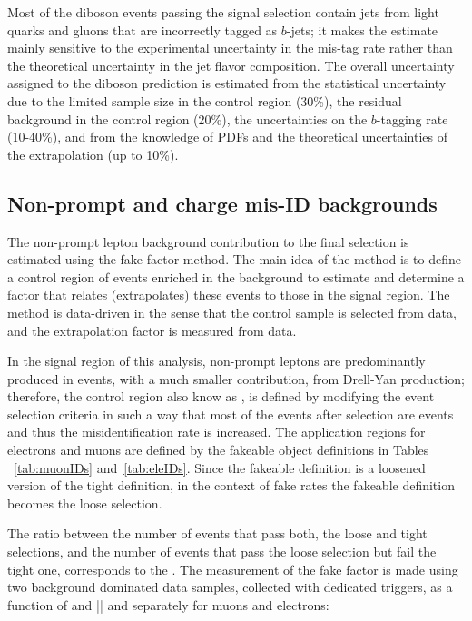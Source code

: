 Most of the diboson events passing the signal selection contain jets from light quarks and gluons that are incorrectly tagged as $b$-jets; it makes the estimate mainly sensitive to the experimental uncertainty in the mis-tag rate rather than the theoretical uncertainty in the jet flavor composition. The overall uncertainty assigned to the diboson prediction is estimated from the statistical uncertainty due to the limited sample size in the control region (30\%), the residual background in the control region (20\%), the uncertainties on the $b$-tagging rate (10-40\%), and from the knowledge of PDFs and the theoretical uncertainties of the extrapolation (up to 10\%).

\subsection{Non-prompt and charge mis-ID backgrounds}\label{ssec:fake_rate}

The non-prompt lepton background contribution to the final selection is estimated using the fake factor method. The main idea of the method is to define a control region of events enriched in the background to estimate and determine a factor that relates (extrapolates) these events to those in the signal region. The method is data-driven in the sense that the control sample is selected from data, and the extrapolation factor is measured from data.

In the signal region of this analysis, non-prompt leptons are predominantly produced in \ttbar events, with a much smaller contribution, from Drell-Yan production; therefore, the control region also know as , is defined by modifying the event selection criteria in such a way that most of the events after selection are \ttbar events and thus the misidentification rate is increased. The application regions for electrons and muons are defined by the fakeable object definitions in Tables ~\ref{tab:muonIDs} and~\ref{tab:eleIDs}. Since the fakeable definition is a loosened version of the tight definition, in the context of fake rates the fakeable definition becomes the loose selection. 

The ratio between the number of events that pass both, the loose and tight selections, and the number of events that pass the loose selection but fail the tight one, corresponds to the . The measurement of the fake factor is made using two background dominated data samples, collected with dedicated triggers, %
as a function of \pt and |\etac| and separately for muons and electrons:

